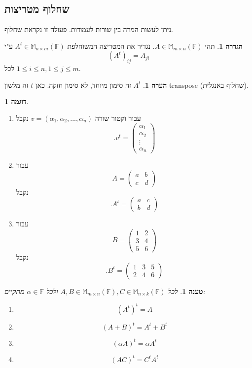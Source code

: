 \documentclass[12pt]{report}
\theoremstyle{plain}
\newtheorem{proposition}[theorem]{טענה}
\theoremstyle{definition}
\newtheorem{definition}[theorem]{הגדרה}
\newtheorem{example}{דוגמה}[chapter]
\newtheorem{remark}{הערה}[chapter]
\newcommand{\F}{\mathbb{F}}
\newcommand{\M}{\mathbb{M}}
\newcommand{\0}{\mathbf{0}}
\begin{document}
\subsection{שחלוף מטריצות}
ניתן לעשות המרה בין שורות לעמודות. פעולה זו נקראת שחלוף.

\begin{definition}
תהי
$A\in\M_{m\times n}(\F)$. 
נגדיר את המטריצה המשוחלפת
$A^t\in\M_{n\times m}(\F)$
ע"י
$$
(A^t)_{ij}=A_{ji}
$$
לכל
$1\leq i\leq n,1\leq j\leq m$.
\end{definition}

\begin{remark}
$A^t$
זה סימון מיוחד, לא סימון חזקה. כאן
$t$
זה מלשון
transpose
(שחלוף באנגלית).
\end{remark}

\begin{example}\
\begin{enumerate}[label=\alph*.]
\item 
עבור וקטור שורה
$v=(\alpha_1,\alpha_2,...,\alpha_n)$
נקבל
$$
.v^t=\begin{pmatrix}
\alpha_1\\
\alpha_2\\
\vdots \\
\alpha_n
\end{pmatrix}
$$

\item 
עבור
$$
A=\begin{pmatrix}
a &b\\
c & d
\end{pmatrix}
$$
נקבל
$$
.A^t=\begin{pmatrix}
a &c\\
b & d
\end{pmatrix}
$$


\item 
עבור
$$
B=\begin{pmatrix}
1 &2\\
3 & 4\\
5 & 6
\end{pmatrix}
$$
נקבל
$$
.B^t=\begin{pmatrix}
1 &3 &5\\
2 & 4 &6
\end{pmatrix}
$$


\end{enumerate}
\end{example}


\begin{proposition}\label{prop:transpose}
לכל 
$A,B\in\M_{m\times n}(\F), C\in\M_{n\times k}(\F)$
ולכל
$\alpha\in\F$
מתקיים:
\begin{enumerate}[label=\alph*.]
\item 
$$
(A^t)^t=A
$$


\item 
$$
(A+B)^t=A^t+B^t
$$

\item 
$$
(\alpha A)^t=\alpha A^t
$$


\item 
$$
(AC)^t=C^tA^t
$$


\end{enumerate}
\end{proposition}
\end{document}

